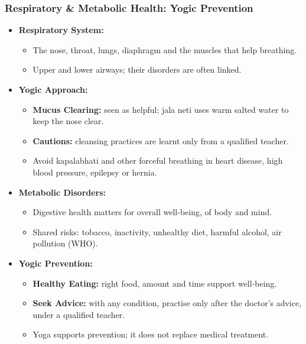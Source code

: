 \begin{frame}[fragile,shrink=8]\frametitle{Respiratory \& Metabolic Health: Yogic Prevention}

    \begin{itemize}
        \item \textbf{Respiratory System:}
        \begin{itemize}
            \item The nose, throat, lungs, diaphragm and the muscles that help breathing.
            \item Upper and lower airways; their disorders are often linked.
        \end{itemize}
        \item \textbf{Yogic Approach:}
        \begin{itemize}
            \item \textbf{Mucus Clearing:} seen as helpful; jala neti uses warm salted water to keep the nose clear.
            \item \textbf{Cautions:} cleansing practices are learnt only from a qualified teacher.
            \item Avoid kapalabhati and other forceful breathing in heart disease, high blood pressure, epilepsy or hernia.
        \end{itemize}
        \item \textbf{Metabolic Disorders:}
        \begin{itemize}
            \item Digestive health matters for overall well-being, of body and mind.
            \item Shared risks: tobacco, inactivity, unhealthy diet, harmful alcohol, air pollution (WHO).
        \end{itemize}
        \item \textbf{Yogic Prevention:}
        \begin{itemize}
            \item \textbf{Healthy Eating:} right food, amount and time support well-being.
            \item \textbf{Seek Advice:} with any condition, practise only after the doctor's advice, under a qualified teacher.
            \item Yoga supports prevention; it does not replace medical treatment.
        \end{itemize}
    \end{itemize}

\end{frame}

